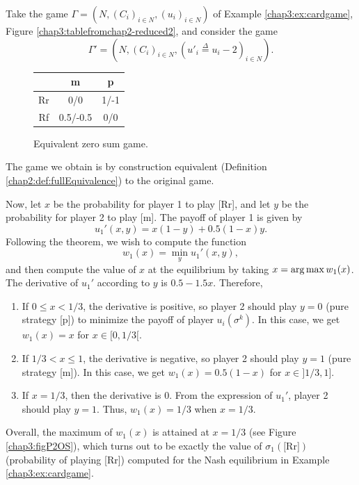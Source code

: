 \begin{example}
Take the game $\Gamma = (N, (C_i)_{i \in N}, (u_i)_{i \in N})$ of
 Example \ref{chap3:ex:cardgame}, Figure \ref{chap3:tablefromchap2-reduced2},
 and consider the game $$\Gamma' = (N, (C_i)_{i \in N}, (u'_i \overset{\Delta}{ =} u_i-2)_{i \in N}).$$

\begin{figure}[!ht]
\centering
\begin{tabular}{c|cc}
 & m & p \\
\hline
Rr & 0/0 & 1/-1 \\
Rf & 0.5/-0.5 & 0/0
\end{tabular}
\caption{Equivalent zero sum game. }
\label{chap3:tablefromchap2-eq0sum}
\end{figure}
The game we obtain is by construction equivalent (Definition \ref{chap2:def:fullEquivalence}) to the original game.

Now, let $x$ be the probability for player 1 to play [Rr], and let $y$  be the probability for player 2 to play [m].  The payoff of player 1 is given by
$$u_1'(x,y) = x(1-y) + 0.5 (1-x)y. $$
Following the theorem, we wish to compute the function
$$ w_1(x) = \min_{y} u_1'(x,y),$$
and then compute the value of $x$ at the equilibrium by taking $x = \operatorname*{arg\,max} w_1(x)$.
The derivative of $u_1'$ according to $y$ is $0.5 - 1.5 x$. Therefore,
\begin{enumerate}
\item If $0 \leq x < 1/3$, the derivative is positive, so player 2 should play $y = 0$ (pure strategy [p]) to minimize the payoff of player $u_i(\sigma^k)$.
In this case, we get $w_1(x) = x$ for $x \in [0, 1/3[$.
\item If $1/3 < x \leq 1$, the derivative is negative, so player 2 should play $y = 1$ (pure strategy [m]).
In this case, we get $w_1(x) = 0.5(1-x)$ for $x \in ]1/3, 1]$.
\item If $x = 1/3$, then the derivative is 0. From the expression of $u_1'$, player 2 should play $y = 1$. Thus, $w_1(x) = 1/3$ when $x = 1/3$.
\end{enumerate}

Overall, the maximum of $w_1(x)$ is attained at $x = 1/3$ (see Figure \ref{chap3:figP2OS}),  which turns out to be exactly the value of $\sigma_1(\text{[Rr]})$ (probability of playing [Rr]) computed for the Nash equilibrium in Example \ref{chap3:ex:cardgame}.




\end{example}
